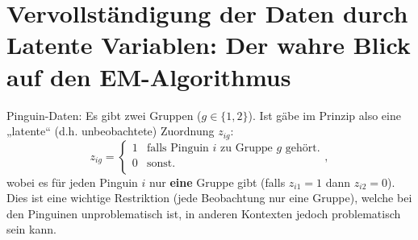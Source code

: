 \documentclass[
]{book}
\newenvironment{Shaded}{\begin{snugshade}}{\end{snugshade}}
\newcommand{\CommentTok}[1]{\textcolor[rgb]{0.56,0.35,0.01}{\textit{#1}}}
\newcommand{\ControlFlowTok}[1]{\textcolor[rgb]{0.13,0.29,0.53}{\textbf{#1}}}
\newcommand{\DataTypeTok}[1]{\textcolor[rgb]{0.13,0.29,0.53}{#1}}
\newcommand{\DecValTok}[1]{\textcolor[rgb]{0.00,0.00,0.81}{#1}}
\newcommand{\KeywordTok}[1]{\textcolor[rgb]{0.13,0.29,0.53}{\textbf{#1}}}
\newcommand{\NormalTok}[1]{#1}
\newcommand{\OperatorTok}[1]{\textcolor[rgb]{0.81,0.36,0.00}{\textbf{#1}}}
\newcommand{\OtherTok}[1]{\textcolor[rgb]{0.56,0.35,0.01}{#1}}
\newcommand{\StringTok}[1]{\textcolor[rgb]{0.31,0.60,0.02}{#1}}
\begin{document}
\begin{Shaded}
\end{Shaded}

\hypertarget{vervollstuxe4ndigung-der-daten-durch-latente-variablen-der-wahre-blick-auf-den-em-algorithmus}{%
\section{Vervollständigung der Daten durch Latente Variablen: Der wahre Blick auf den EM-Algorithmus}\label{vervollstuxe4ndigung-der-daten-durch-latente-variablen-der-wahre-blick-auf-den-em-algorithmus}}

Pinguin-Daten: Es gibt zwei Gruppen (\(g\in\{1,2\}\)). Ist gäbe im Prinzip also eine „latente`` (d.h. unbeobachtete) Zuordnung \(z_{ig}\):
\[
z_{ig}=
\left\{\begin{array}{ll}
1&\text{falls Pinguin }i\text{ zu Gruppe }g\text{ gehört.}\\
0&\text{sonst.}\\
\end{array}\right.,
\]
wobei es für jeden Pinguin \(i\) nur \textbf{eine} Gruppe gibt (falls \(z_{i1}=1\) dann \(z_{i2}=0\)). Dies ist eine wichtige Restriktion (jede Beobachtung nur eine Gruppe), welche bei den Pinguinen unproblematisch ist, in anderen Kontexten jedoch problematisch sein kann.
\end{document}
